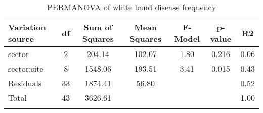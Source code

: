 \begin{longtable}{lcccccc}
\toprule
\textbf{Variation source} & \textbf{df} & \textbf{Sum of Squares} & \textbf{Mean Squares} & \textbf{F-Model} & \textbf{p-value} & \textbf{R2} \\ 
\midrule
sector & 2 & 204.14 & 102.07 & 1.80 & 0.216 & 0.06 \\ 
sector:site & 8 & 1548.06 & 193.51 & 3.41 & 0.015 & 0.43 \\ 
Residuals & 33 & 1874.41 & 56.80 &  &  & 0.52 \\ 
Total & 43 & 3626.61 &  &  &  & 1.00 \\ 
\bottomrule
\caption{\label{tab:somelabel} PERMANOVA of white band disease frequency}
\end{longtable}

